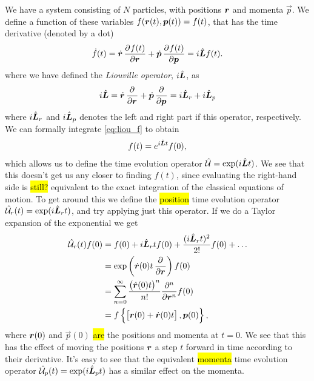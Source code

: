 We have a system consisting of $N$ particles, with positions $\boldsymbol{r}$ and momenta $\vec p$. We define a function of these variables $f(\boldsymbol{r}(t), \boldsymbol{p}(t)) = f(t)$, that has the time derivative %
(denoted by a dot)
\begin{align}
    \dot f(t) = \dot \rvec \dpd{f(t)}{\rvec} + \dot {\vec p} \dpd{f(t)}{\vec p} = \Liou f(t).
    \label{eq:liou_f}
\end{align}
where we have defined the \emph{Liouville operator}, $i\hat{\boldsymbol{L}}$, as
\begin{align*}
    \Liou = \dot \rvec \dpd{}{\rvec} + \dot {\vec p} \dpd{}{\vec p} = \Liou_r + \Liou_p
\end{align*}
where $i\hat{\boldsymbol{L}}_r$ and $i\hat{\boldsymbol{L}}_p$ denotes the left and right part if this operator, respectively. %
We can formally integrate \cref{eq:liou_f} to obtain
\begin{align}
    f(t) = e^{i\hat{\boldsymbol{L}} t} f(0),
    \label{eq:liou_integrate}
\end{align}
which allows us to define the time evolution operator $\hat{\mathcal{U}} = \exp(i\hat{\boldsymbol{L}} t)$. We see that this doesn't get us any closer to finding $f(t)$, since evaluating the right-hand side is \hl{still?} equivalent to the exact integration of the classical equations of motion. To get around this we define the \hl{position} time evolution operator $\hat{\mathcal{U}}_r(t) = \exp(i\hat{\boldsymbol{L}}_r t)$, and try applying just this operator. If we do a Taylor expansion of the exponential we get
\begin{align*}
    \Lop_r(t)f(0)
    &= f(0) + \Liou_r t f(0) + \frac{(\Liou_r t)^2}{2!} f(0) + \dots \\
    &= \exp\left( \dot\rvec (0) t \dpd{}{\rvec} \right) f(0) \\
    &= \sum_{n=0}^\infty \frac{ \big(\dot\rvec(0) t\big)^n}{n!} \frac{\partial^n}{\partial \rvec^n} f(0) \\
    &= f\left\{ \left[ \rvec(0) + \dot\rvec(0)t \right], \vec p(0) \right\},
\end{align*}
where $\boldsymbol{r}(0)$ and $\vec p(0)$ \hl{are} the positions and momenta at $t = 0$. We see that this has the effect of moving the positions $\boldsymbol{r}$ a step $t$ forward in time according to their derivative. It's easy to see that the equivalent \hl{momenta} time evolution operator $\hat{\mathcal{U}}_p(t) = \exp(i\hat{\boldsymbol{L}}_p t)$ has a similar effect on the momenta. 

